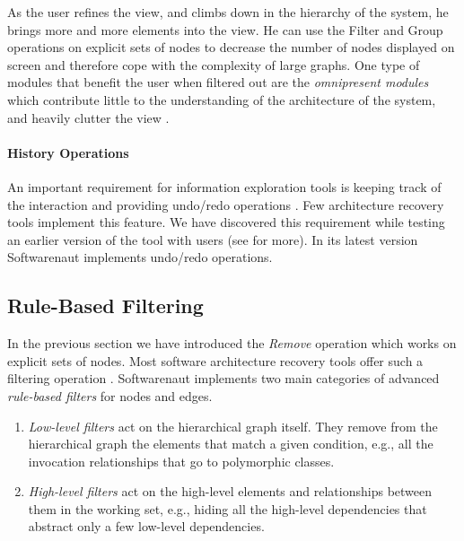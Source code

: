 \documentclass[preprint,12pt]{elsarticle}
\begin{document}
As the user refines the view, and climbs down in the hierarchy of the system, he brings more and more elements into the view. He can use the Filter and Group operations on explicit sets of nodes to decrease the number of nodes displayed on screen and therefore cope with the complexity of large graphs. One type of modules that benefit the user when filtered out are the {\em omnipresent modules} which contribute little to the understanding of the architecture of the system, and heavily clutter the view \cite{mitchell-bunch}.


\paragraph {History Operations} An important requirement for information exploration tools is keeping track of the interaction and providing undo/redo operations \cite{shneid-eyes}. Few architecture recovery tools implement this feature. We have discovered this requirement while testing an earlier version of the tool with users (see  for more). In its latest version Softwarenaut implements undo/redo operations.


\subsection {Rule-Based Filtering} 

In the previous section we have introduced the {\em Remove} operation which works on explicit sets of nodes. Most software architecture recovery tools offer such a filtering operation \cite{aracic-filtering}. 
Softwarenaut implements two main categories of advanced {\em rule-based filters} for nodes and edges. 

\begin{enumerate}

\item {\em Low-level filters} act on the hierarchical graph itself. They remove from the hierarchical graph the elements that match a given condition, e.g., all the invocation relationships that go to polymorphic classes.

\item {\em High-level filters} act on the high-level elements and relationships between them in the working set, e.g., hiding all the high-level dependencies that abstract only a few low-level dependencies.

\end{enumerate}
\end{document}
